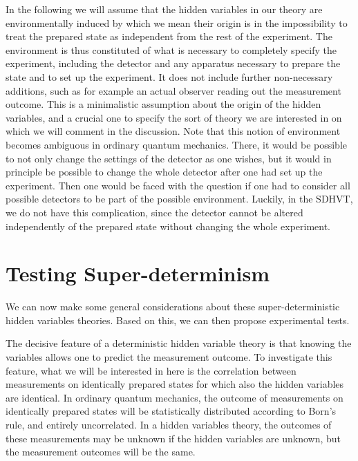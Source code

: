 \documentclass[12pt]{article}                    %
\begin{document}

In the following we will assume that the hidden variables in our theory are 
environmentally induced by which we mean their origin is in the impossibility
to treat the prepared state as independent from the rest of the experiment.
The environment is thus constituted of what is necessary to completely
specify the experiment, including the detector and any apparatus
necessary to prepare the state and to set up the experiment. It does not
include further non-necessary additions, such as for example an actual
observer reading out the measurement outcome. This is a minimalistic
assumption about the origin of the hidden variables, and a crucial one to
specify the sort of theory we are interested in on which
we will comment in the discussion. Note that this notion
of environment becomes ambiguous in ordinary quantum mechanics. There, it
would be possible to not only change the settings of the detector
as one wishes, but it would in principle be possible to change the whole
detector after one had set up the experiment. Then one would be faced
with the question if one had to consider all possible detectors to be
part of the possible environment. Luckily, in the {\sc SDHVT}, we do not
have this complication, since the detector cannot
be altered independently of the prepared state without changing
the whole experiment. 

\section{Testing Super-determinism}

We can now make some general considerations about these super-deterministic hidden variables
theories. Based on this, we can then propose experimental tests. 

The decisive feature of a deterministic hidden variable theory is that
knowing the variables allows one to predict the measurement outcome. To investigate
this feature, what we will
be interested in here is the correlation between measurements on identically
prepared states for which also the hidden variables are identical. In ordinary quantum mechanics, 
the outcome of measurements on 
identically prepared states will be statistically distributed according to Born's rule,
and entirely uncorrelated. In a hidden variables
theory, the outcomes of these measurements may be unknown if the hidden variables are unknown,
but the measurement outcomes will be the same. 
\end{document}
